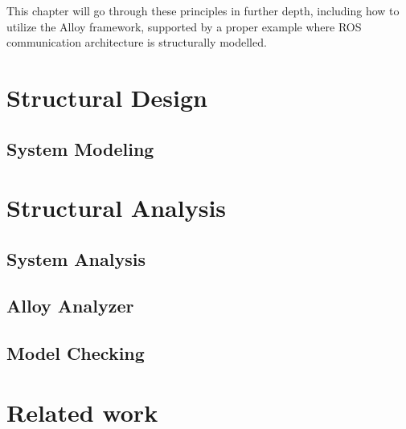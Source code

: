 This chapter will go through these principles in further depth, including how to utilize the Alloy framework, supported by a proper example where ROS communication architecture is structurally modelled.


\section{Structural Design}

\subsection{System Modeling}

\section{Structural Analysis}

\subsection{System Analysis}

\subsection{Alloy Analyzer}

\subsection{Model Checking}

\section{Related work}\label{s:alloy-relWork}
